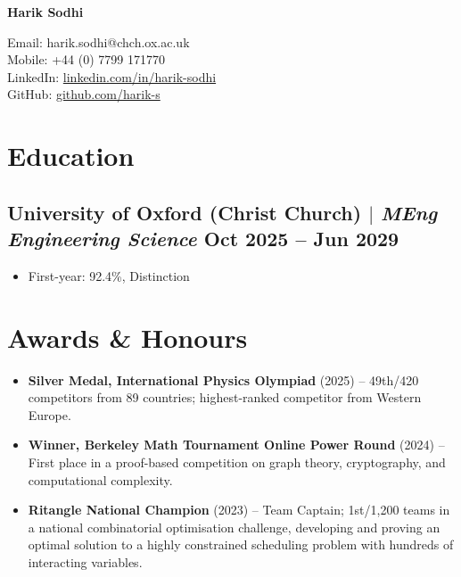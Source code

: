 \documentclass[9pt]{article} %
\begin{document}
\begin{center}
    \begin{minipage}{0.45\textwidth}
        {\Huge\bfseries
            Harik Sodhi %
        } \\ \medskip
    \end{minipage} \hfill
    \begin{minipage}{0.5\textwidth}
        \raggedleft
        Email: harik.sodhi@chch.ox.ac.uk \\
        Mobile: +44 (0) 7799 171770 \\
        LinkedIn: \href{https://linkedin.com/in/harik-sodhi}{linkedin.com/in/harik-sodhi}\\
        GitHub: \href{https://github.com/harik-s}{github.com/harik-s}\\
    \end{minipage}
\end{center}

\section{Education}

\subsection{University of Oxford (Christ Church) $|$ {\normalfont\itshape MEng Engineering Science} \hfill Oct 2025 -- Jun 2029}
\begin{itemize}
    \item First-year: 92.4\%, Distinction
\end{itemize}


\section{Awards \& Honours}

\begin{itemize}[leftmargin=*]
    \item \textbf{Silver Medal, International Physics Olympiad} (2025) -- 49th/420 competitors from 89 countries; highest-ranked competitor from Western Europe.
    
    \item \textbf{Winner, Berkeley Math Tournament Online Power Round} (2024) -- First place in a proof-based competition on graph theory, cryptography, and computational complexity.
    
	\item \textbf{Ritangle National Champion} (2023) -- Team Captain; 1st/1,200 teams in a national combinatorial optimisation challenge, developing and proving an optimal solution to a highly constrained scheduling problem with hundreds of interacting variables.
\end{itemize}
\end{document}
